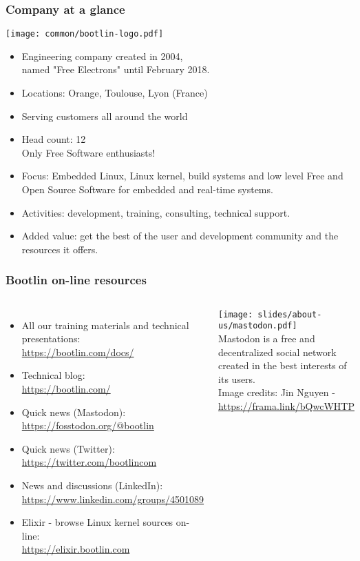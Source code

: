 \begin{frame}
\frametitle{Company at a glance}
  \texttt{[image: common/bootlin-logo.pdf]}
  \begin{itemize}
    \item Engineering company created in 2004,\\
          named "Free Electrons" until February 2018.
    \item Locations: Orange, Toulouse, Lyon (France)
    \item Serving customers all around the world
    \item Head count: 12 \\
	  Only Free Software enthusiasts!
    \item Focus: Embedded Linux, Linux kernel,
          build systems and low level Free and Open Source Software
          for embedded and real-time systems.
    \item Activities: development, training, consulting, technical
          support.
    \item Added value: get the best of the user and development
          community and the resources it offers.
  \end{itemize}
\end{frame}

\begin{frame}
\frametitle{Bootlin on-line resources}
\begin{columns}
  \begin{itemize}
    \item All our training materials and technical presentations:\\
          \url{https://bootlin.com/docs/}
    \item Technical blog:\\
          \url{https://bootlin.com/}
    \item Quick news (Mastodon):\\
          \url{https://fosstodon.org/@bootlin}
    \item Quick news (Twitter):\\
          \url{https://twitter.com/bootlincom}
    \item News and discussions (LinkedIn):\\
	  \url{https://www.linkedin.com/groups/4501089}
    \item Elixir - browse Linux kernel sources on-line:\\
          \url{https://elixir.bootlin.com}
  \end{itemize}
  \texttt{[image: slides/about-us/mastodon.pdf]}\\
  \vspace{3cm}
  \small Mastodon is a free and decentralized social network created
  in the best interests of its users.\\
  \vspace{0.5cm}
  \tiny Image credits: Jin Nguyen - \url{https://frama.link/bQwcWHTP}
\end{columns}
\end{frame}
